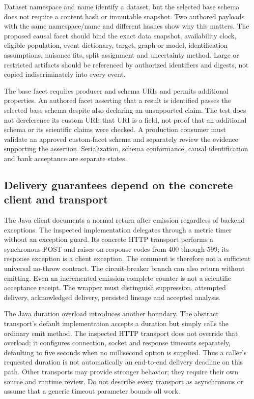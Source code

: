 Dataset namespace and name identify a dataset, but the selected base schema
does not require a content hash or immutable snapshot. Two authored payloads
with the same namespace/name and different hashes show why this matters.
The proposed causal facet should bind the exact data snapshot, availability
clock, eligible population, event dictionary, target, graph or model,
identification assumptions, nuisance fits, split assignment and uncertainty
method. Large or restricted artifacts should be referenced by authorized
identifiers and digests, not copied indiscriminately into every event.
\citep{exec24_openlineage_source,exec24_openlineage_reference}

The base facet requires producer and schema URIs and permits additional
properties. An authored facet asserting that a result is identified passes
the selected base schema despite also declaring an unsupported claim. The
test does not dereference its custom URI: that URI is a field, not proof that
an additional schema or its scientific claims were checked. A production
consumer must validate an approved custom-facet schema and separately review
the evidence supporting the assertion. Serialization, schema conformance,
causal identification and bank acceptance are separate states.
\citep{exec24_openlineage_source,exec24_openlineage_reference}

\subsection{Delivery guarantees depend on the concrete client and transport}
The Java client documents a normal return after emission regardless of backend
exceptions. The inspected implementation delegates through a metric timer
without an exception guard. Its concrete HTTP transport performs a synchronous
POST and raises on response codes from 400 through 599; its response exception
is a client exception. The comment is therefore not a sufficient universal
no-throw contract. The circuit-breaker branch can also return without emitting.
Even an incremented emission-complete counter is not a scientific acceptance
receipt. The wrapper must distinguish suppression, attempted delivery,
acknowledged delivery, persisted lineage and accepted analysis.
\citep{exec24_openlineage_source}

The Java duration overload introduces another boundary. The abstract
transport's default implementation accepts a duration but simply calls the
ordinary emit method. The inspected HTTP transport does not override that
overload; it configures connection, socket and response timeouts separately,
defaulting to five seconds when no millisecond option is supplied. Thus a
caller's requested duration is not automatically an end-to-end delivery
deadline on this path. Other transports may provide stronger behavior; they
require their own source and runtime review. Do not describe every transport
as asynchronous or assume that a generic timeout parameter bounds all work.
\citep{exec24_openlineage_source}

